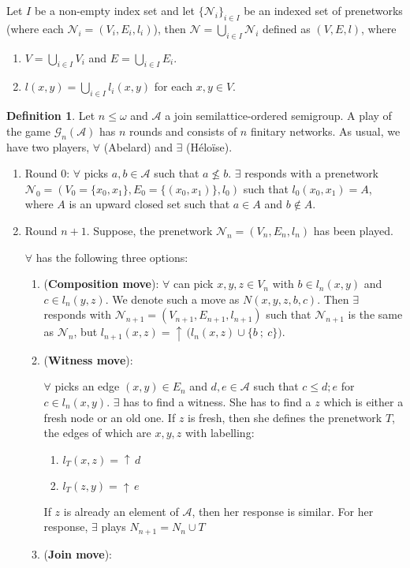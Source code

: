 \documentclass[a4paper]{article}
\theoremstyle{definition}
\newtheorem{definition}{Definition}
\theoremstyle{theorem}
\theoremstyle{proposition}
\theoremstyle{lemma}
\theoremstyle{ex}
\theoremstyle{corollary}
\theoremstyle{claim}
\newcommand{\up}[1]{\ensuremath{{\uparrow}\,#1}}
\begin{document}
Let $I$ be a non-empty index set and let $\{ \mathcal{N}_i \}_{i \in I}$ be an indexed set of prenetworks (where each $\mathcal{N}_i = (V_i, E_i, l_i)$), then $\mathcal{N} = \bigcup \limits_{i \in I} \mathcal{N}_i$ defined as $(V, E, l)$, where

\begin{enumerate}
  \item $V = \bigcup \limits_{i \in I} V_i$ and $E = \bigcup \limits_{i \in I} E_i$.
  \item $l(x, y) = \bigcup \limits_{ i \in I } l_i(x, y)$ for each $x, y \in V$.
\end{enumerate}

\begin{definition}
  Let $n \leq \omega$ and $\mathcal{A}$ a join semilattice-ordered semigroup. A play of the game $\mathcal{G}_n(\mathcal{A})$ has $n$ rounds and consists of $n$ finitary networks. As usual, we have two players, $\forall$ (Abelard) and $\exists$ (H\'{e}lo\"{i}se).

  \begin{enumerate}
    \item Round $0$: $\forall$ picks $a, b \in \mathcal{A}$ such that $a \not\leq b$. $\exists$ responds with a prenetwork $\mathcal{N}_0 = (V_0 = \{ x_0, x_1 \}, E_0 = \{ (x_0, x_1)\}, l_0)$ such that $l_0(x_0, x_1) = A$, where $A$ is an upward closed set such that $a \in A$ and $b \notin A$.
    \item Round $n + 1$. Suppose, the prenetwork $\mathcal{N}_n = (V_n, E_n, l_n)$ has been played.

    $\forall$ has the following three options:
    \begin{enumerate}
      \item ({\bf Composition move}): $\forall$ can pick $x, y, z \in V_n$ with $b \in l_n(x, y)$ and $c \in l_n(y, z)$. We denote such a move as $N(x,y,z,b,c)$. Then $\exists$ responds with $\mathcal{N}_{n + 1} = (V_{n + 1}, E_{n + 1}, l_{n + 1})$ such that $\mathcal{N}_{n + 1}$
      is the same as $\mathcal{N}_n$, but $l_{n + 1}(x, z) = \up{(l_{n}(x, z)} \cup \{ b \: ; \: c \})$.
      \item ({\bf Witness move}):

      $\forall$ picks an edge $(x, y) \in E_n$ and $d, e \in \mathcal{A}$ such that $c \leq d ; e$ for $c \in l_n(x, y)$. $\exists$ has to find a witness. She has to find a $z$ which is either a fresh node or an old one. If $z$ is fresh, then she defines the prenetwork $T$, the edges of which are $x, y, z$ with labelling:
      \begin{enumerate}
        \item $l_T(x, z) = \up{d}$
        \item $l_T(z, y) = \up{e}$
      \end{enumerate}
      If $z$ is already an element of $\mathcal{A}$, then her response is similar.
      For her response, $\exists$ plays $N_{n + 1} = N_n \cup T$
      \item ({\bf Join move}):


\end{enumerate}
\end{enumerate}
\end{definition}
\end{document}
